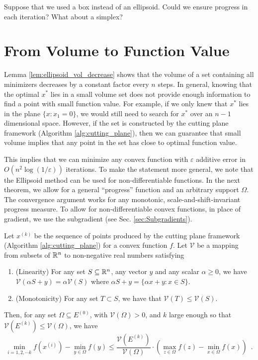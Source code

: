 \begin{xca}
Suppose that we used a box instead of an ellipsoid. Could we ensure
progress in each iteration? What about a simplex?
\end{xca}


\section{From Volume to Function Value\label{sec:vol2val}}

Lemma \ref{lem:ellipsoid_vol_decrease} shows that the volume of a
set containing all minimizers decreases by a constant factor every
$n$ steps. In general, knowing that the optimal $x^{*}$ lies in
a small volume set does not provide enough information to find a point
with small function value. For example, if we only knew that $x^{*}$
lies in the plane $\{x:x_{1}=0\}$, we would still need to search
for $x^{*}$ over an $n-1$ dimensional space. However, if the set
is constructed by the cutting plane framework (Algorithm \ref{alg:cutting_plane}),
then we can guarantee that small volume implies that any point in
the set has close to optimal function value.

This implies that we can minimize any convex function with $\varepsilon$
additive error in $O(n^{2}\log(1/\varepsilon))$ iterations. To make
the statement more general, we note that the Ellipsoid method can
be used for non-differentiable functions. In the next theorem, we
allow for a general ``progress'' function and an arbitrary support
$\Omega$. The convergence argument works for any monotonic, scale-and-shift-invariant
progress measure. To allow for non-differentiable convex functions,
in place of gradient, we use the subgradient (see Sec. \ref{sec:Subgradients}). 
\begin{thm}
\label{thm:conv_opt}Let $x^{(k)}$ be the sequence of points produced
by the cutting plane framework (Algorithm \ref{alg:cutting_plane})
for a convex function $f$. Let $\mathcal{V}$ be a mapping from subsets
of $\mathbb{R}^{n}$ to non-negative real numbers satisfying
\begin{enumerate}
\item (Linearity) For any set $S\subseteq\mathbb{R}^{n}$, any vector $y$ and any
scalar $\alpha\geq0$, we have $\mathcal{V}(\alpha S+y)=\alpha\mathcal{V}(S)$
where $\alpha S+y=\{\alpha x+y:x\in S\}$.
\item (Monotonicity) For any set $T\subset S$, we have that $\mathcal{V}(T)\leq\mathcal{V}(S)$.
\end{enumerate}
Then, for any set $\Omega\subseteq E^{(0)}$, with $\mathcal{V}(\Omega)>0$,
and $k$ large enough so that $\mathcal{V}(E^{(k)})\le\mathcal{V}(\Omega)$,
we have
\[
\min_{i=1,2,\cdots k}f(x^{(i)})-\min_{y\in\Omega}f(y)\leq\frac{\mathcal{V}(E^{(k)})}{\mathcal{V}(\Omega)}\cdot\left(\max_{z\in\Omega}f(z)-\min_{x\in\Omega}f(x)\right)\enspace.
\]
\end{thm}

